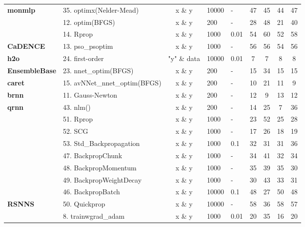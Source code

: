 \begin{Schunk}
\begin{table}[!h]
\begin{tabular}[t]{>{}llcllcccc}
\multirow{-2}{*}{\raggedright\arraybackslash \textbf{monmlp}} & 35. optimx(Nelder-Mead) & x \& y & 10000 & - & 47 & 45 & 44 & 47\\
\cmidrule{1-9}
 & 12. optim(BFGS) & x \& y & 200 & - & 28 & 48 & 21 & 40\\

 & 14. Rprop & x \& y & 1000 & 0.01 & 54 & 60 & 52 & 58\\

\multirow{-3}{*}{\raggedright\arraybackslash \textbf{CaDENCE}} & 13. pso\_psoptim & x \& y & 1000 & - & 56 & 56 & 54 & 56\\
\cmidrule{1-9}
\textbf{h2o} & 24. first-order & "y" \& data & 10000 & 0.01 & 7 & 7 & 8 & 8\\
\cmidrule{1-9}
\textbf{EnsembleBase} & 23. nnet\_optim(BFGS) & x \& y & 200 & - & 15 & 34 & 15 & 15\\
\cmidrule{1-9}
\textbf{caret} & 15. avNNet\_nnet\_optim(BFGS) & x \& y & 200 & - & 10 & 21 & 11 & 9\\
\cmidrule{1-9}
\textbf{brnn} & 11. Gauss-Newton & x \& y & 200 & - & 12 & 9 & 13 & 12\\
\cmidrule{1-9}
\textbf{qrnn} & 43. nlm() & x \& y & 200 & - & 14 & 25 & 7 & 36\\
\cmidrule{1-9}
 & 51. Rprop & x \& y & 1000 & - & 23 & 52 & 25 & 28\\

 & 52. SCG & x \& y & 1000 & - & 17 & 26 & 18 & 19\\

 & 53. Std\_Backpropagation & x \& y & 1000 & 0.1 & 32 & 31 & 31 & 36\\

 & 47. BackpropChunk & x \& y & 1000 & - & 34 & 41 & 32 & 34\\

 & 48. BackpropMomentum & x \& y & 1000 & - & 35 & 39 & 35 & 30\\

 & 49. BackpropWeightDecay & x \& y & 1000 & - & 30 & 43 & 33 & 31\\

 & 46. BackpropBatch & x \& y & 10000 & 0.1 & 48 & 27 & 50 & 48\\

\multirow{-8}{*}{\raggedright\arraybackslash \textbf{RSNNS}} & 50. Quickprop & x \& y & 10000 & - & 58 & 36 & 58 & 57\\
\cmidrule{1-9}
 & 8. trainwgrad\_adam & x \& y & 1000 & 0.01 & 20 & 35 & 16 & 20\\


\end{tabular}
\end{table}
\end{Schunk}
